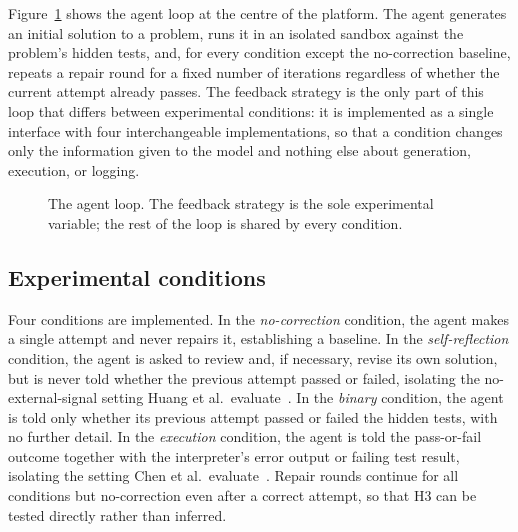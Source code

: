 \documentclass[conference]{IEEEtran}
\begin{document}
Figure~\ref{fig:architecture} shows the agent loop at the centre of the platform. The agent generates an initial solution to a problem, runs it in an isolated sandbox against the problem's hidden tests, and, for every condition except the no-correction baseline, repeats a repair round for a fixed number of iterations regardless of whether the current attempt already passes. The feedback strategy is the only part of this loop that differs between experimental conditions: it is implemented as a single interface with four interchangeable implementations, so that a condition changes only the information given to the model and nothing else about generation, execution, or logging.

\begin{figure}[htbp]
\centering
{}
\caption{The agent loop. The feedback strategy is the sole experimental variable; the rest of the loop is shared by every condition.}
\label{fig:architecture}
\end{figure}

\subsection{Experimental conditions}

Four conditions are implemented. In the \emph{no-correction} condition, the agent makes a single attempt and never repairs it, establishing a baseline. In the \emph{self-reflection} condition, the agent is asked to review and, if necessary, revise its own solution, but is never told whether the previous attempt passed or failed, isolating the no-external-signal setting Huang et al.\ evaluate~\cite{huang2024}. In the \emph{binary} condition, the agent is told only whether its previous attempt passed or failed the hidden tests, with no further detail. In the \emph{execution} condition, the agent is told the pass-or-fail outcome together with the interpreter's error output or failing test result, isolating the setting Chen et al.\ evaluate~\cite{chen2024}. Repair rounds continue for all conditions but no-correction even after a correct attempt, so that H3 can be tested directly rather than inferred.
\end{document}
